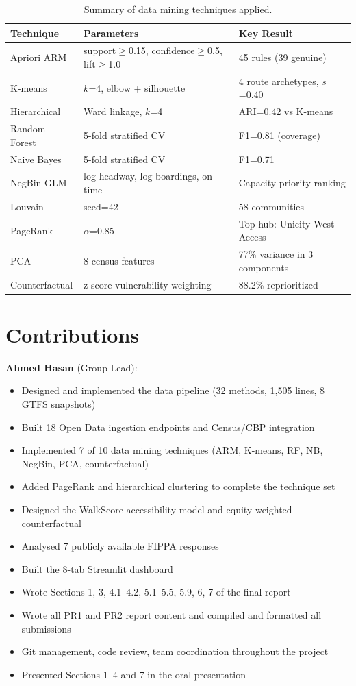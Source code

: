 \documentclass[11pt]{article}
\begin{document}
\begin{table}[H]
\centering\scriptsize
\caption{Summary of data mining techniques applied.}
\label{tab:technique_summary}
\begin{tabularx}{\textwidth}{@{}lXl@{}}
\toprule
\textbf{Technique} & \textbf{Parameters} & \textbf{Key Result} \\
\midrule
Apriori ARM & support$\geq$0.15, confidence$\geq$0.5, lift$\geq$1.0 & 45 rules (39 genuine) \\
K-means & $k$=4, elbow + silhouette & 4 route archetypes, $s$=0.40 \\
Hierarchical & Ward linkage, $k$=4 & ARI=0.42 vs K-means \\
Random Forest & 5-fold stratified CV & F1=0.81 (coverage) \\
Naive Bayes & 5-fold stratified CV & F1=0.71 \\
NegBin GLM & log-headway, log-boardings, on-time & Capacity priority ranking \\
Louvain & seed=42 & 58 communities \\
PageRank & $\alpha$=0.85 & Top hub: Unicity West Access \\
PCA & 8 census features & 77\% variance in 3 components \\
Counterfactual & z-score vulnerability weighting & 88.2\% reprioritized \\
\bottomrule
\end{tabularx}
\end{table}

\section{Contributions}

\textbf{Ahmed Hasan} (Group Lead):
\begin{itemize}[nosep]
\item Designed and implemented the data pipeline (32 methods, 1{,}505 lines, 8 GTFS snapshots)
\item Built 18 Open Data ingestion endpoints and Census/CBP integration
\item Implemented 7 of 10 data mining techniques (ARM, K-means, RF, NB, NegBin, PCA, counterfactual)
\item Added PageRank and hierarchical clustering to complete the technique set
\item Designed the WalkScore accessibility model and equity-weighted counterfactual
\item Analysed 7 publicly available FIPPA responses
\item Built the 8-tab Streamlit dashboard
\item Wrote Sections 1, 3, 4.1--4.2, 5.1--5.5, 5.9, 6, 7 of the final report
\item Wrote all PR1 and PR2 report content and compiled and formatted all submissions
\item Git management, code review, team coordination throughout the project
\item Presented Sections 1--4 and 7 in the oral presentation
\end{itemize}
\end{document}
